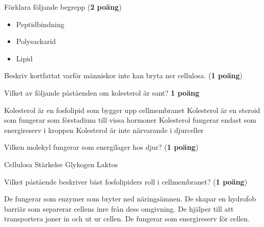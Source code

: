 \documentclass{exam}
\begin{document}
\vspace{5mm} %
\begin{center}
\end{center}
\begin{questions}

\question Förklara följande begrepp (\textbf{2 poäng})

\begin{itemize}
  \item Peptidbindning
  \vspace{10mm}
  \item Polysackarid
  \vspace{10mm}
  \item Lipid
\end{itemize}

\vspace{10mm} %

\question
Beskriv kortfattat varför människor inte kan bryta ner cellulosa. (\textbf{1 poäng})
\vspace{20mm}

\question Vilket av följande påståenden om kolesterol är sant? \textbf{1 poäng}
\vspace{5mm}
\begin{checkboxes}
    \choice Kolesterol är en fosfolipid som bygger upp cellmembranet
    \choice Kolesterol är en steroid som fungerar som förstadium till vissa hormoner
    \choice Kolesterol fungerar endast som energireserv i kroppen
    \choice Kolesterol är inte närvarande i djurceller
\end{checkboxes}


\vspace{10mm}
\question
Vilken molekyl fungerar som energilager hos djur? (\textbf{1 poäng})
\vspace{5mm}
\begin{checkboxes}
    \choice Cellulosa
    \choice Stärkelse
    \choice Glykogen
    \choice Laktos
\end{checkboxes}
\break


\question Vilket påstående beskriver bäst fosfolipiders roll i cellmembranet? (\textbf{1 poäng})
\vspace{5mm}
\begin{checkboxes}
    \choice De fungerar som enzymer som bryter ned näringsämnen.
    \choice De skapar en hydrofob barriär som separerar cellens inre från dess omgivning.
    \choice De hjälper till att transportera joner in och ut ur cellen.
    \choice De fungerar som energireserv för cellen.
\end{checkboxes}



\end{questions}
\end{document}
